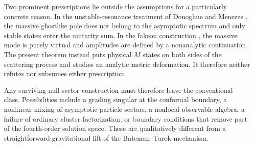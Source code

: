 \documentclass[11pt]{article}
\theoremstyle{definition}
\theoremstyle{remark}
\begin{document}
Two prominent prescriptions lie outside the assumptions for a
particularly concrete reason.  In the unstable-resonance treatment of
Donoghue and Menezes \cite{DonoghueMenezes}, the massive ghostlike pole
does not belong to the asymptotic spectrum and only stable states enter
the unitarity sum.  In the fakeon construction
\cite{AnselmiFakeon}, the massive mode is purely virtual and amplitudes
are defined by a nonanalytic continuation.  The present theorem instead
puts physical $M$ states on both sides of the scattering process and
studies an analytic metric deformation.  It therefore neither refutes
nor subsumes either prescription.

Any surviving null-sector construction must therefore leave the
conventional class.  Possibilities include a grading singular at the
conformal boundary, a nonlinear mixing of asymptotic particle sectors, a
nonlocal observable algebra, a failure of ordinary cluster
factorization, or boundary conditions that remove part of the
fourth-order solution space.  These are qualitatively different from a
straightforward gravitational lift of the Bateman--Turok mechanism.
\end{document}
